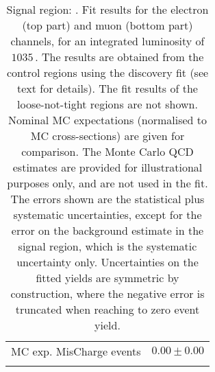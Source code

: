 \begin{table}
\begin{center}
{\begin{tabular*}{\textwidth}{@{\extracolsep{\fill}}lr}
        MC exp. MisCharge events         & $0.00 \pm 0.00$              \\
\noalign{\smallskip}\hline\noalign{\smallskip}
\end{tabular*}
}
\end{center}
\caption{Signal region: . Fit results for the electron (top part) and muon (bottom part) channels, for an integrated luminosity of $1035$\,\ipb.
The results are obtained from the control regions using the discovery fit (see text for details). The fit results of the loose-not-tight regions are not shown.
Nominal MC expectations (normalised to MC cross-sections) are given for comparison. 
The Monte Carlo QCD estimates are provided for illustrational purposes only, and are not used in the fit.
The errors shown are the statistical plus systematic uncertainties, except for the error on the background estimate in the signal region, which is the systematic uncertainty only.
Uncertainties on the fitted yields are symmetric by construction, 
where the negative error is truncated when reaching to zero event yield.
}
\label{table.results.systematics.in.logL.fit.table.results.yields}
\end{table}
%